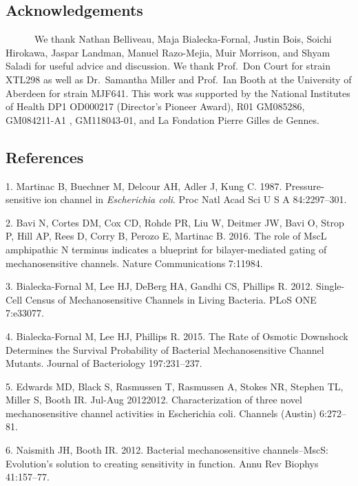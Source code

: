 \subsection{Acknowledgements}\label{acknowledgements}

~ ~ ~
~We
thank
Nathan
Belliveau,
Maja
Bialecka-Fornal,
Justin
Bois,
Soichi
Hirokawa,
Jaspar
Landman,
Manuel
Razo-Mejia,
Muir
Morrison,
and
Shyam
Saladi
for
useful
advice
and
discussion.
We
thank
Prof.~Don
Court
for
strain
XTL298
as
well
as
Dr.~Samantha
Miller
and
Prof.~Ian
Booth
at the
University
of
Aberdeen
for
strain
MJF641.
This
work
was
supported
by the
National
Institutes
of
Health
DP1
OD000217
(Director's
Pioneer
Award),
R01
GM085286,
GM084211-A1
,
GM118043-01,
and La
Fondation
Pierre
Gilles
de
Gennes.

\subsection*{References}\label{references}

\hypertarget{refs}{}
\hypertarget{ref-martinac1987}{}
1.
Martinac
B,
Buechner
M,
Delcour
AH,
Adler
J,
Kung
C.
1987.
Pressure-sensitive
ion
channel
in
\emph{Escherichia
coli}.
Proc
Natl
Acad
Sci U
S A
84:2297--301.

\hypertarget{ref-bavi2016}{}
2.
Bavi
N,
Cortes
DM,
Cox
CD,
Rohde
PR,
Liu W,
Deitmer
JW,
Bavi
O,
Strop
P,
Hill
AP,
Rees
D,
Corry
B,
Perozo
E,
Martinac
B.
2016.
The
role
of
MscL
amphipathic
N
terminus
indicates
a
blueprint
for
bilayer-mediated
gating
of
mechanosensitive
channels.
Nature
Communications
7:11984.

\hypertarget{ref-bialecka-fornal2012}{}
3.
Bialecka-Fornal
M, Lee
HJ,
DeBerg
HA,
Gandhi
CS,
Phillips
R.
2012.
Single-Cell
Census
of
Mechanosensitive
Channels
in
Living
Bacteria.
PLoS
ONE
7:e33077.

\hypertarget{ref-bialecka-fornal2015}{}
4.
Bialecka-Fornal
M, Lee
HJ,
Phillips
R.
2015.
The
Rate
of
Osmotic
Downshock
Determines
the
Survival
Probability
of
Bacterial
Mechanosensitive
Channel
Mutants.
Journal
of
Bacteriology
197:231--237.

\hypertarget{ref-edwards2012}{}
5.
Edwards
MD,
Black
S,
Rasmussen
T,
Rasmussen
A,
Stokes
NR,
Stephen
TL,
Miller
S,
Booth
IR.
Jul-Aug
20122012.
Characterization
of
three
novel
mechanosensitive
channel
activities
in
Escherichia
coli.
Channels
(Austin)
6:272--81.

\hypertarget{ref-naismith2012}{}
6.
Naismith
JH,
Booth
IR.
2012.
Bacterial
mechanosensitive
channels--MscS:
Evolution's
solution
to
creating
sensitivity
in
function.
Annu
Rev
Biophys
41:157--77.

